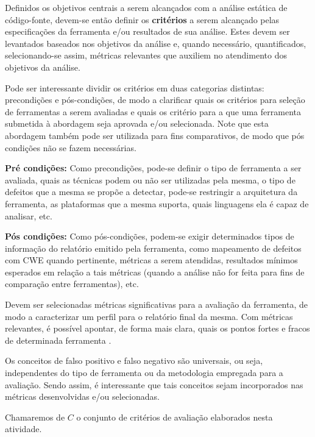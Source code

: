 Definidos os objetivos centrais a serem alcançados com a análise estática de código-fonte, devem-se então definir os \textbf{critérios} a serem alcançado pelas especificações da ferramenta e/ou resultados de sua análise. Estes devem ser levantados baseados nos objetivos da análise e, quando necessário, quantificados, selecionando-se assim, métricas relevantes que auxiliem no atendimento dos objetivos da análise.

Pode ser interessante dividir os critérios em duas categorias distintas: precondições e pós-condições, de modo a clarificar quais os critérios para seleção de ferramentas a serem avaliadas e quais os critério para a que uma ferramenta submetida à abordagem seja aprovada e/ou selecionada. Note que esta abordagem também pode ser utilizada para fins comparativos, de modo que pós condições não se fazem necessárias.

\textbf{Pré condições:} Como precondições, pode-se definir o tipo de ferramenta a ser avaliada, quais as técnicas podem ou não ser utilizadas pela mesma, o tipo de defeitos que a mesma se propõe a detectar, pode-se restringir a arquitetura da ferramenta, as plataformas que a mesma suporta, quais linguagens ela é capaz de analisar, etc.

\textbf{Pós condições:} Como pós-condições, podem-se exigir determinados tipos de informação do relatório emitido pela ferramenta, como mapeamento de defeitos com CWE quando pertinente, métricas a serem atendidas, resultados mínimos esperados em relação a tais métricas (quando a análise não for feita para fins de comparação entre ferramentas), etc.

Devem ser selecionadas métricas significativas para a avaliação da ferramenta, de modo a caracterizar um perfil para o relatório final da mesma. Com métricas relevantes, é possível apontar, de forma mais clara, quais os pontos fortes e fracos de determinada ferramenta \cite{nsa}.

Os conceitos de falso positivo e falso negativo são universais, ou seja, independentes do tipo de ferramenta ou da metodologia empregada para a avaliação. Sendo assim, é interessante que tais conceitos sejam incorporados nas métricas desenvolvidas e/ou selecionadas.

Chamaremos de $C$ o conjunto de critérios de avaliação elaborados nesta atividade.

